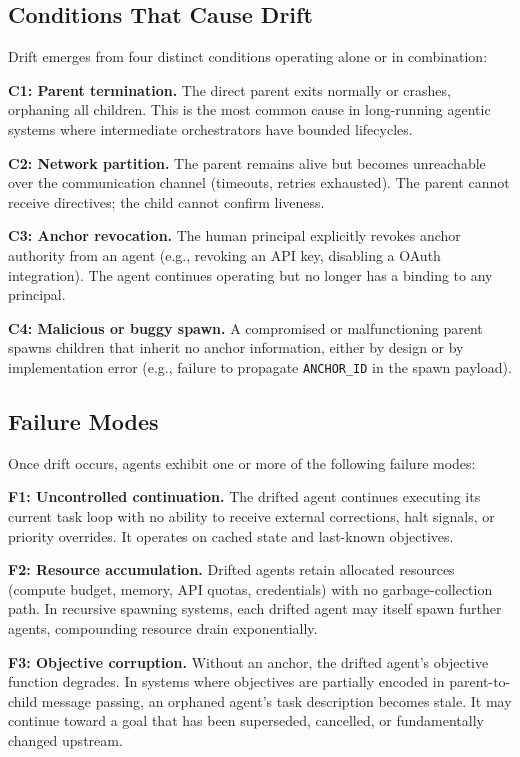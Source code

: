 \subsection{Conditions That Cause Drift}

Drift emerges from four distinct conditions operating alone or in combination:

\medskip
\noindent\textbf{C1: Parent termination.} The direct parent exits normally or crashes, orphaning all children. This is the most common cause in long-running agentic systems where intermediate orchestrators have bounded lifecycles.

\medskip
\noindent\textbf{C2: Network partition.} The parent remains alive but becomes unreachable over the communication channel (timeouts, retries exhausted). The parent cannot receive directives; the child cannot confirm liveness.

\medskip
\noindent\textbf{C3: Anchor revocation.} The human principal explicitly revokes anchor authority from an agent (e.g., revoking an API key, disabling a OAuth integration). The agent continues operating but no longer has a binding to any principal.

\medskip
\noindent\textbf{C4: Malicious or buggy spawn.} A compromised or malfunctioning parent spawns children that inherit no anchor information, either by design or by implementation error (e.g., failure to propagate \texttt{ANCHOR\_ID} in the spawn payload).

\subsection{Failure Modes}

Once drift occurs, agents exhibit one or more of the following failure modes:

\medskip
\noindent\textbf{F1: Uncontrolled continuation.} The drifted agent continues executing its current task loop with no ability to receive external corrections, halt signals, or priority overrides. It operates on cached state and last-known objectives.

\medskip
\noindent\textbf{F2: Resource accumulation.} Drifted agents retain allocated resources (compute budget, memory, API quotas, credentials) with no garbage-collection path. In recursive spawning systems, each drifted agent may itself spawn further agents, compounding resource drain exponentially.

\medskip
\noindent\textbf{F3: Objective corruption.} Without an anchor, the drifted agent's objective function degrades. In systems where objectives are partially encoded in parent-to-child message passing, an orphaned agent's task description becomes stale. It may continue toward a goal that has been superseded, cancelled, or fundamentally changed upstream.


